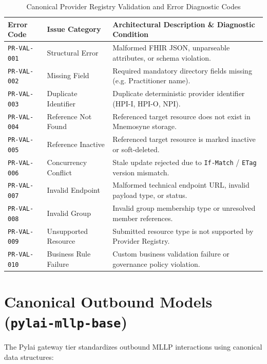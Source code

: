 \begin{table}[htbp]
\centering
\small
\begin{tabularx}{\textwidth}{l l X}
\toprule
\textbf{Error Code} & \textbf{Issue Category} & \textbf{Architectural Description \& Diagnostic Condition} \\
\midrule
\texttt{PR-VAL-001} & Structural Error & Malformed FHIR JSON, unparseable attributes, or schema violation. \\
\texttt{PR-VAL-002} & Missing Field & Required mandatory directory fields missing (e.g. Practitioner name). \\
\texttt{PR-VAL-003} & Duplicate Identifier & Duplicate deterministic provider identifier (HPI-I, HPI-O, NPI). \\
\texttt{PR-VAL-004} & Reference Not Found & Referenced target resource does not exist in Mnemosyne storage. \\
\texttt{PR-VAL-005} & Reference Inactive & Referenced target resource is marked inactive or soft-deleted. \\
\texttt{PR-VAL-006} & Concurrency Conflict & Stale update rejected due to \texttt{If-Match} / \texttt{ETag} version mismatch. \\
\texttt{PR-VAL-007} & Invalid Endpoint & Malformed technical endpoint URL, invalid payload type, or status. \\
\texttt{PR-VAL-008} & Invalid Group & Invalid group membership type or unresolved member references. \\
\texttt{PR-VAL-009} & Unsupported Resource & Submitted resource type is not supported by Provider Registry. \\
\texttt{PR-VAL-010} & Business Rule Failure & Custom business validation failure or governance policy violation. \\
\bottomrule
\end{tabularx}
\caption{Canonical Provider Registry Validation and Error Diagnostic Codes}
\label{tab:provider_registry_validation_codes}
\end{table}

\section{Canonical Outbound Models (\texttt{pylai-mllp-base})}

The Pylai gateway tier standardizes outbound MLLP interactions using canonical data structures:

